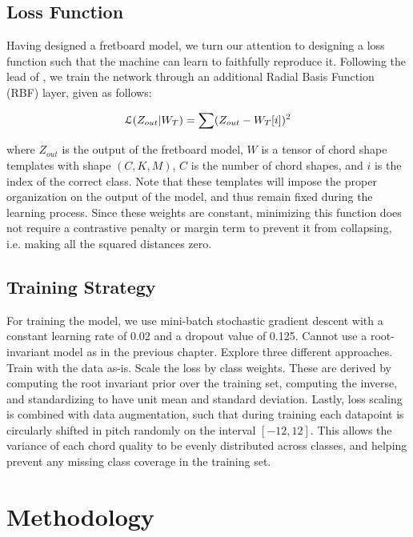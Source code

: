 \subsection{Loss Function}
\label{subsec:loss}

Having designed a fretboard model, we turn our attention to designing a loss function such that the machine can learn to faithfully reproduce it.
Following the lead of \cite{LeCun1998}, we train the network through an additional Radial Basis Function (RBF) layer, given as follows:

\begin{equation}
\small
\mathcal{L}(Z_{out} \vert W_T) = \sum(Z_{out} - W_{T}[i])^2
\end{equation}

\noindent where $Z_{out}$ is the output of the fretboard model, $W$ is a tensor of chord shape templates with shape $(C,K,M)$, $C$ is the number of chord shapes, and $i$ is the index of the correct class.
Note that these templates will impose the proper organization on the output of the model, and thus remain fixed during the learning process.
Since these weights are constant, minimizing this function does not require a contrastive penalty or margin term to prevent it from collapsing, i.e. making all the squared distances zero.


\subsection{Training Strategy}
\label{subsec:strategy}


For training the model, we use mini-batch stochastic gradient descent with a constant learning rate of 0.02 and a dropout value of 0.125.
Cannot use a root-invariant model as in the previous chapter.
Explore three different approaches.
Train with the data as-is.
Scale the loss by class weights.
These are derived by computing the root invariant prior over the training set, computing the inverse, and standardizing to have unit mean and standard deviation.
Lastly, loss scaling is combined with data augmentation, such that during training each datapoint is circularly shifted in pitch randomly on the interval $[-12, 12]$.
This allows the variance of each chord quality to be evenly distributed across classes, and helping prevent any missing class coverage in the training set.


\section{Methodology}

